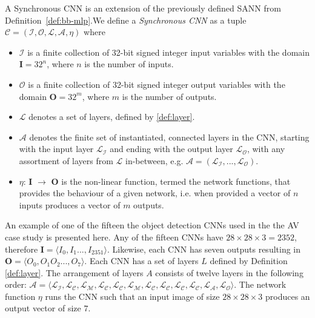 \begin{definition}
	\label{def:cnn}
	A Synchronous \ac{CNN} is an extension of the previously defined \ac{SANN} from Definition~\ref{def:bb-mlp}.We define a \emph{Synchronous \ac{CNN}} as a tuple $\mathcal{C} = (\mathcal{I}, \mathcal{O}, \mathcal{L}, \mathcal{A}, \eta)$ where
	\begin{itemize}
		\item $\mathcal{I}$ is a finite collection of 32-bit signed integer input variables with the domain \textbf{I}$ = 32^n$, where $n$ is the number of inputs.
		\item $\mathcal{O}$ is a finite collection of 32-bit signed integer output variables with the domain \textbf{O}$ = 32^m$, where $m$ is the number of outputs.
		\item $\mathcal{L}$ denotes a set of layers, defined by \ref{def:layer}.
		\item $\mathcal{A}$ denotes the finite set of instantiated, connected layers in the \ac{CNN}, starting with the input layer $\mathcal{L}_\mathcal{I}$ and ending with the output layer $\mathcal{L}_\mathcal{O}$, with any assortment of layers from $\mathcal{L}$ in-between, e.g. $\mathcal{A} = (\mathcal{L}_\mathcal{I}, ..., \mathcal{L}_\mathcal{O})$.
		\item $\eta$: \textbf{I} $\rightarrow$ \textbf{O} is the non-linear function, termed the network functions, that provides the behaviour of a given network, i.e. when provided a vector of $n$ inputs produces a vector of $m$ outputs. 
	\end{itemize}
\end{definition}

\begin{example}
	\label{ex:cnn}
	An example of one of the fifteen the object detection \acp{CNN} used in the the \ac{AV} case study is presented here.
	Any of the fifteen \acp{CNN} have $28 \times 28 \times 3 = 2352$, therefore \textbf{I}$ = \langle I_0, I_1 ..., I_2351 \rangle$.
	Likewise, each CNN has seven outputs resulting in \textbf{O}$ = \langle O_0, O_1 O_2 ..., O_7 \rangle$.
	Each \ac{CNN} has a set of layers $L$ defined by Definition \ref{def:layer}.
	The arrangement of layers $A$ consists of twelve layers in the following order: $\mathcal{A} = \langle \mathcal{L}_\mathcal{I}, \mathcal{L}_\mathcal{C}, \mathcal{L}_\mathcal{M}, \mathcal{L}_\mathcal{C}, \mathcal{L}_\mathcal{C}, \mathcal{L}_\mathcal{M}, \mathcal{L}_\mathcal{C}, \mathcal{L}_\mathcal{C}, \mathcal{L}_\mathcal{C}, \mathcal{L}_\mathcal{C}, \mathcal{L}_\mathcal{A}, \mathcal{L}_\mathcal{O} \rangle$.
	The network function $\eta$ runs the \ac{CNN} such that an input image of size $28 \times 28 \times 3$ produces an output vector of size $7$.
\end{example}

